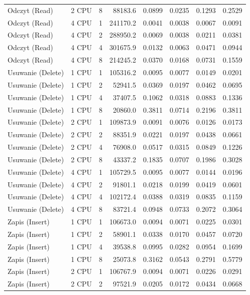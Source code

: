 \begin{table}[ht]
{\begin{tabular}{llcrrrrr}
Odczyt (Read) & 2 CPU & 8 & 88183.6 & 0.0899 & 0.0235 & 0.1293 & 0.2529 \\
Odczyt (Read) & 4 CPU & 1 & 241170.2 & 0.0041 & 0.0038 & 0.0067 & 0.0091 \\
Odczyt (Read) & 4 CPU & 2 & 288950.2 & 0.0069 & 0.0038 & 0.0211 & 0.0381 \\
Odczyt (Read) & 4 CPU & 4 & 301675.9 & 0.0132 & 0.0063 & 0.0471 & 0.0944 \\
Odczyt (Read) & 4 CPU & 8 & 214245.2 & 0.0370 & 0.0168 & 0.0731 & 0.1559 \\
Usuwanie (Delete) & 1 CPU & 1 & 105316.2 & 0.0095 & 0.0077 & 0.0149 & 0.0201 \\
Usuwanie (Delete) & 1 CPU & 2 & 52941.5 & 0.0369 & 0.0197 & 0.0462 & 0.0695 \\
Usuwanie (Delete) & 1 CPU & 4 & 37407.5 & 0.1062 & 0.0318 & 0.0883 & 0.1336 \\
Usuwanie (Delete) & 1 CPU & 8 & 20860.0 & 0.3811 & 0.0714 & 0.2196 & 0.3811 \\
Usuwanie (Delete) & 2 CPU & 1 & 109873.9 & 0.0091 & 0.0076 & 0.0126 & 0.0173 \\
Usuwanie (Delete) & 2 CPU & 2 & 88351.9 & 0.0221 & 0.0197 & 0.0438 & 0.0661 \\
Usuwanie (Delete) & 2 CPU & 4 & 76908.0 & 0.0517 & 0.0315 & 0.0849 & 0.1226 \\
Usuwanie (Delete) & 2 CPU & 8 & 43337.2 & 0.1835 & 0.0707 & 0.1986 & 0.3028 \\
Usuwanie (Delete) & 4 CPU & 1 & 105729.5 & 0.0095 & 0.0077 & 0.0144 & 0.0196 \\
Usuwanie (Delete) & 4 CPU & 2 & 91801.1 & 0.0218 & 0.0199 & 0.0419 & 0.0601 \\
Usuwanie (Delete) & 4 CPU & 4 & 102172.4 & 0.0388 & 0.0319 & 0.0835 & 0.1159 \\
Usuwanie (Delete) & 4 CPU & 8 & 83721.4 & 0.0948 & 0.0733 & 0.2072 & 0.3064 \\
Zapis (Insert) & 1 CPU & 1 & 106673.0 & 0.0094 & 0.0071 & 0.0225 & 0.0301 \\
Zapis (Insert) & 1 CPU & 2 & 58901.1 & 0.0338 & 0.0170 & 0.0457 & 0.0720 \\
Zapis (Insert) & 1 CPU & 4 & 39538.8 & 0.0995 & 0.0282 & 0.0954 & 0.1699 \\
Zapis (Insert) & 1 CPU & 8 & 25073.8 & 0.3162 & 0.0543 & 0.2791 & 0.5779 \\
Zapis (Insert) & 2 CPU & 1 & 106767.9 & 0.0094 & 0.0071 & 0.0226 & 0.0291 \\
Zapis (Insert) & 2 CPU & 2 & 97521.9 & 0.0205 & 0.0172 & 0.0434 & 0.0668 \\

\end{tabular}}
\end{table}
